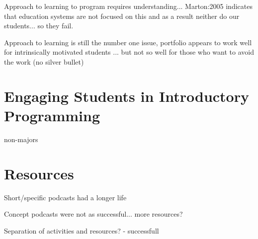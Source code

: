 Approach to learning to program requires understanding... Marton:2005 indicates that education systems are not focused on this and as a result neither do our students... so they fail.

Approach to learning is still the number one issue, portfolio appears to work well for intrinsically motivated students ... but not so well for those who want to avoid the work (no silver bullet)


\section{Engaging Students in Introductory Programming} %
\label{sec:engaging_students_in_introductory_programming}


\citet{Guzdial:2005} non-majors


\section{Resources} %
\label{sec:resources}

Short/specific podcasts had a longer life

Concept podcasts were not as successful... more resources?

Separation of activities and resources? - successfull






